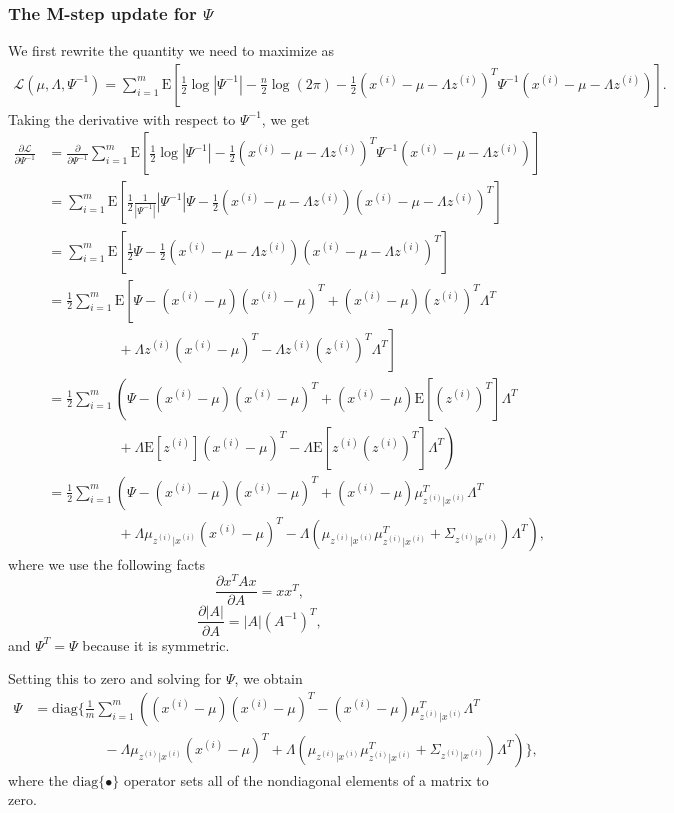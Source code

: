 \documentclass{article}
\begin{document}
\subsubsection{The M-step update for $\Psi$}
We first rewrite the quantity we need to maximize as
\[
\begin{split}
\mathcal{L}(\mu,\Lambda,\Psi^{-1})
=\sum_{i=1}^m \text{E}\left[\frac{1}{2}\log|\Psi^{-1}|-\frac{n}{2}\log(2\pi)
-\frac{1}{2}(x^{(i)}-\mu-\Lambda z^{(i)})^T\Psi^{-1}(x^{(i)}-\mu-\Lambda z^{(i)})\right].
\end{split}
\]
Taking the derivative with respect to $\Psi^{-1}$, we get
\[
\begin{split}
\frac{\partial \mathcal{L}}{\partial\Psi^{-1}}
&=\frac{\partial }{\partial\Psi^{-1}}\sum_{i=1}^m \text{E}
\left[\frac{1}{2}\log|\Psi^{-1}|-\frac{1}{2}(x^{(i)}-\mu-\Lambda z^{(i)})^T\Psi^{-1}(x^{(i)}-\mu-\Lambda z^{(i)})\right]\\
&=\sum_{i=1}^m \text{E}\left[\frac{1}{2}\frac{1}{|\Psi^{-1}|}|\Psi^{-1}|\Psi
-\frac{1}{2}(x^{(i)}-\mu-\Lambda z^{(i)})(x^{(i)}-\mu-\Lambda z^{(i)})^T\right]\\
&=\sum_{i=1}^m \text{E}\left[\frac{1}{2}\Psi-\frac{1}{2}(x^{(i)}-\mu-\Lambda z^{(i)})(x^{(i)}-\mu-\Lambda z^{(i)})^T\right]\\
&=\frac{1}{2}\sum_{i=1}^m \text{E}\left[\Psi-(x^{(i)}-\mu)(x^{(i)}-\mu)^T+(x^{(i)}-\mu)(z^{(i)})^T\Lambda^T\right.\\
&\qquad\qquad\quad+\left.\Lambda z^{(i)}(x^{(i)}-\mu)^T-\Lambda z^{(i)}(z^{(i)})^T\Lambda^T\right]\\
&=\frac{1}{2}\sum_{i=1}^m \left(\Psi-(x^{(i)}-\mu)(x^{(i)}-\mu)^T+(x^{(i)}-\mu)\text{E}[(z^{(i)})^T]\Lambda^T\right.\\
&\qquad\qquad\quad+\left.\Lambda \text{E}[z^{(i)}](x^{(i)}-\mu)^T-\Lambda \text{E}[z^{(i)}(z^{(i)})^T]\Lambda^T\right)\\
&=\frac{1}{2}\sum_{i=1}^m \left(\Psi-(x^{(i)}-\mu)(x^{(i)}-\mu)^T+(x^{(i)}-\mu)\mu_{z^{(i)}|x^{(i)}}^T\Lambda^T\right.\\
&\qquad\qquad\quad+\left.\Lambda \mu_{z^{(i)}|x^{(i)}}(x^{(i)}-\mu)^T
-\Lambda (\mu_{z^{(i)}|x^{(i)}}\mu_{z^{(i)}|x^{(i)}}^T+\Sigma_{z^{(i)}|x^{(i)}})\Lambda^T\right),
\end{split}
\]
where we use the following facts
\[
\frac{\partial{x^TAx}}{\partial{A}}=xx^T,
\]
\[
\frac{\partial{|A|}}{\partial{A}}=|A|(A^{-1})^T,
\]
and $\Psi^T=\Psi$ because it is symmetric.

Setting this to zero and solving for $\Psi$, we obtain
\[
\begin{split}
\Psi&=\text{diag}\Bigg\{\frac{1}{m}\sum_{i=1}^m \left((x^{(i)}-\mu)(x^{(i)}-\mu)^T-(x^{(i)}-\mu)\mu_{z^{(i)}|x^{(i)}}^T\Lambda^T\right.\\
&\qquad\qquad\quad-\left.\Lambda \mu_{z^{(i)}|x^{(i)}}(x^{(i)}-\mu)^T
+\Lambda (\mu_{z^{(i)}|x^{(i)}}\mu_{z^{(i)}|x^{(i)}}^T+\Sigma_{z^{(i)}|x^{(i)}})\Lambda^T\right)\Bigg\},
\end{split}
\]
where the $\text{diag}\{\bullet\}$ operator sets all of the nondiagonal elements of a matrix to zero.
\end{document}
